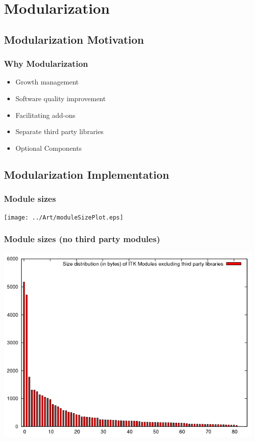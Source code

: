 \section{Modularization}

\subsection{Modularization Motivation}

\begin{frame}
\frametitle{Why Modularization}
\begin{itemize}
\item Growth management
\pause
\item Software quality improvement
\pause
\item Facilitating add-ons
\pause
\item Separate third party libraries
\pause
\item Optional Components
\end{itemize}
\end{frame}

\subsection{Modularization Implementation}

\begin{frame}
\frametitle{Module sizes}
\center
\begin{center}
\texttt{[image: ../Art/moduleSizePlot.eps]}
\end{center}
\end{frame}

\begin{frame}
\frametitle{Module sizes (no third party modules)}
\center
\begin{center}
\includegraphics[height=0.8\textheight]{../Art/moduleSizePlotNoThirdParty.png}
\end{center}
\end{frame}

